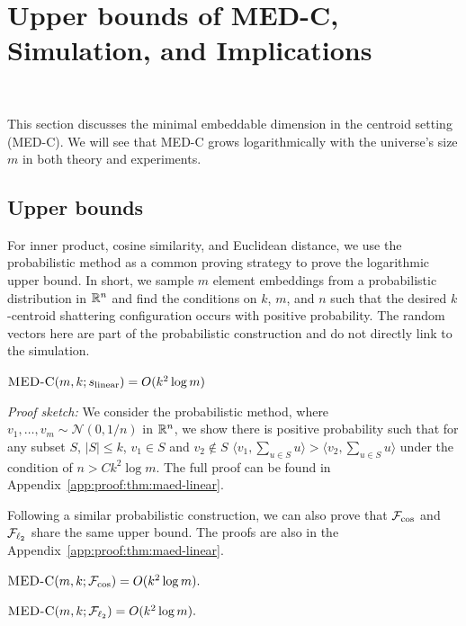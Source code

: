 \section{Upper bounds of MED-C, Simulation, and Implications}~\label{sec:maed_and_exp}

This section discusses the minimal embeddable dimension in the centroid setting (MED-C).
We will see that MED-C grows logarithmically with the universe's size $m$ in both theory and experiments.

\subsection{Upper bounds}

For inner product, cosine similarity, and Euclidean distance, we use the probabilistic method as a common proving strategy to prove the logarithmic upper bound. In short, we sample $m$ element embeddings from a probabilistic distribution in $\mathbb{R}^n$ and find the conditions on $k$, $m$, and $n$ such that the desired $k$-centroid shattering configuration occurs with positive probability. The random vectors here are part of the probabilistic construction and do not directly link to the simulation.

\begin{theorem}\label{thm:medc-linear}
    $\textsc{MED-C}(m, k; s_{\rm linear})=O(k^2\log m)$
\end{theorem}
\noindent\textit{Proof sketch:} We consider the probabilistic method, where $v_1, \dots, v_m \sim \mathcal{N}(0, 1/n)$ in $\mathbb{R}^n$, we show there is positive probability such that for any subset $S$, $|S|\leq k$, $v_1\in S$ and $v_2\notin S$
$ \langle v_1, \sum_{u\in S} u \rangle > \langle v_2 ,  \sum_{u\in S} u \rangle$ under the condition of $n>Ck^2\log m$. The full proof can be found in Appendix~\ref{app:proof:thm:maed-linear}.

Following a similar probabilistic construction, we can also prove that $\mathcal{F}_{\cos}$ and $\mathcal{F}_{\ell_{2}}$ share the same upper bound. The proofs are also in the Appendix~\ref{app:proof:thm:maed-linear}.
\begin{theorem}\label{thm:medc-cos}
$\textsc{MED-C}(m, k; \mathcal{F}_{\cos})=O(k^2\log m).$
\end{theorem}
\begin{theorem}\label{thm:medc-l2}
$\textsc{MED-C}(m, k; \mathcal{F}_{\ell_{2}})=O(k^2\log m).$
\end{theorem}

